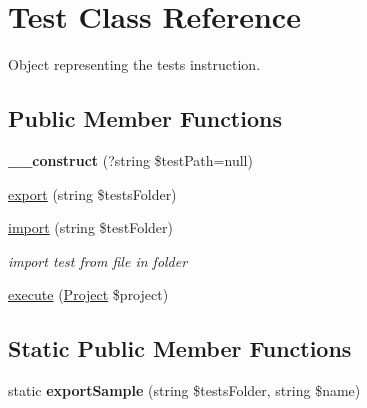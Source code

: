 \hypertarget{classTest}{}\section{Test Class Reference}
\label{classTest}


Object representing the test\textquotesingle{}s instruction.  


\subsection*{Public Member Functions}
\begin{DoxyCompactItemize}
\item 
\mbox{\label{classTest_acf599531126e1b40f3529405e147ecfa}} 
{\bfseries \+\_\+\+\_\+construct} (?string \$test\+Path=null)
\item 
\hyperlink{classTest_a61e3ace38fd982cc3b066c2ab93eb33a}{export} (string \$tests\+Folder)
\item 
\hyperlink{classTest_ab1460ff08b4bc23fe5a01b5afcc18dd2}{import} (string \$test\+Folder)
\begin{DoxyCompactList}\small\item\em import test from file in folder \end{DoxyCompactList}\item 
\hyperlink{classTest_afd7151c1c51e71d95d814b379e0947cd}{execute} (\hyperlink{classProject}{Project} \$project)
\end{DoxyCompactItemize}
\subsection*{Static Public Member Functions}
\begin{DoxyCompactItemize}
\item 
\mbox{\label{classTest_a00189b0d67cee24b1f55ffcf2aa841bf}} 
static {\bfseries export\+Sample} (string \$tests\+Folder, string \$name)
\end{DoxyCompactItemize}
